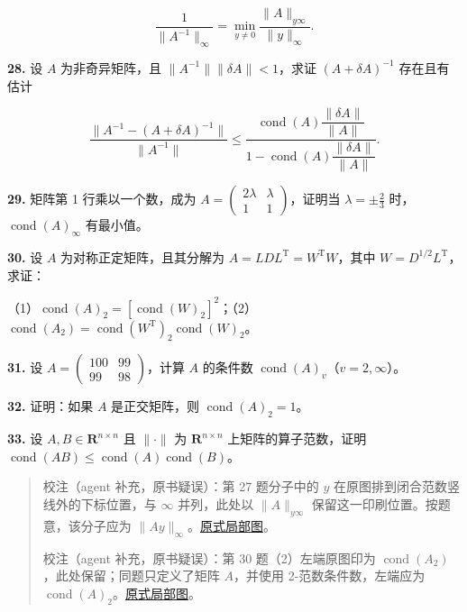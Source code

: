 \[
\frac1{\|A^{-1}\|_\infty}=\min_{y\neq0}\frac{\|A\|_{y\infty}}{\|y\|_\infty}.
\]

\textbf{28.} 设 \(A\) 为非奇异矩阵，且 \(\|A^{-1}\|\|\delta A\|<1\)，求证 \((A+\delta A)^{-1}\) 存在且有估计

\[
\frac{\|A^{-1}-(A+\delta A)^{-1}\|}{\|A^{-1}\|}
\leqslant
\frac{\operatorname{cond}(A)\dfrac{\|\delta A\|}{\|A\|}}
{1-\operatorname{cond}(A)\dfrac{\|\delta A\|}{\|A\|}}.
\]

\textbf{29.} 矩阵第 1 行乘以一个数，成为 \(A=\begin{pmatrix}2\lambda&\lambda\\1&1\end{pmatrix}\)，证明当 \(\lambda=\pm\frac23\) 时，\(\operatorname{cond}(A)_\infty\) 有最小值。

\textbf{30.} 设 \(A\) 为对称正定矩阵，且其分解为 \(A=LDL^{\mathrm T}=W^{\mathrm T}W\)，其中 \(W=D^{1/2}L^{\mathrm T}\)，求证：

（1）\(\operatorname{cond}(A)_2=[\operatorname{cond}(W)_2]^2\)；（2）\(\operatorname{cond}(A_2)=\operatorname{cond}(W^{\mathrm T})_2\operatorname{cond}(W)_2\)。

\textbf{31.} 设 \(A=\begin{pmatrix}100&99\\99&98\end{pmatrix}\)，计算 \(A\) 的条件数 \(\operatorname{cond}(A)_v\)（\(v=2,\infty\)）。

\textbf{32.} 证明：如果 \(A\) 是正交矩阵，则 \(\operatorname{cond}(A)_2=1\)。

\textbf{33.} 设 \(A,B\in\mathbf R^{n\times n}\) 且 \(\|\cdot\|\) 为 \(\mathbf R^{n\times n}\) 上矩阵的算子范数，证明 \(\operatorname{cond}(AB)\leqslant\operatorname{cond}(A)\operatorname{cond}(B)\)。

\begin{quote}
校注（agent 补充，原书疑误）：第 27 题分子中的 \(y\) 在原图排到闭合范数竖线外的下标位置，与 \(\infty\) 并列，此处以 \(\|A\|_{y\infty}\) 保留这一印刷位置。按题意，该分子应为 \(\|Ay\|_\infty\)。\href{verified/assets/ch07b/214-ex27.png}{原式局部图}。

校注（agent 补充，原书疑误）：第 30 题（2）左端原图印为 \(\operatorname{cond}(A_2)\)，此处保留；同题只定义了矩阵 \(A\)，并使用 2-范数条件数，左端应为 \(\operatorname{cond}(A)_2\)。\href{verified/assets/ch07b/214-ex30.png}{原式局部图}。
\end{quote}

